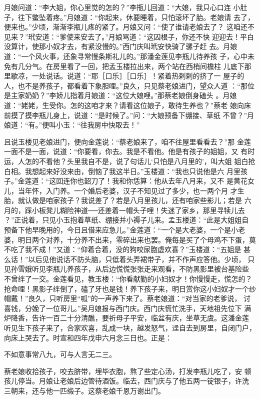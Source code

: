 月娘问道：“李大姐，你心里觉的怎的？”李瓶儿回道：“大娘，我只心口连
小肚子，往下鳖坠着疼。”月娘道：“你起来，休要睡着，只怕滚坏了胎。老娘请
去了，便来也。”少顷，渐渐李瓶儿疼的紧了。月娘又问：“使了谁请老娘去了？
这咱还不见来？”玳安道：“爹使来安去了。”月娘骂道：“这囚根子，你还不快
迎迎去！平白没算计，使那小奴才去，有紧没慢的。”西门庆叫玳安快骑了骡子赶
去。月娘道：“一个风火事，还象寻常慢条斯礼儿的。”那潘金莲见李瓶儿待养孩
子，心中未免有几分气。在房里看了一回，把孟玉楼拉出来，两个站在西梢间檐柱
儿底下那里歇凉，一处说话。说道：“耶［口乐］［口乐］！紧着热剌剌的挤了一
屋子的人，也不是养孩子，都看着下象胆哩。”良久，只见蔡老娘进门，望众人道
：“那位是主家奶奶？”李娇儿指着月娘道：“这位大娘哩。”那蔡老娘倒身磕头
。月娘道：“姥姥，生受你。怎的这咱才来？请看这位娘子，敢待生养也？”蔡老
娘向床前摸了摸李瓶儿身上，说道：“是时候了。”问：“大娘预备下绷接、草纸
不曾？”月娘道：“有。”便叫小玉：“往我房中快取去！”

且说玉楼见老娘进门，便向金莲说：“蔡老娘来了，咱不往屋里看看去？”那
金莲一面不是一面，说道：“你要看，你去。我是不看他。他是有孩子的姐姐，又
有时运，人怎的不看他？头里我自不是，说了句话儿‘只怕是八月里的’，叫大姐
姐白抢白相。我想起来好没来由，倒恼了我这半日。”玉楼道：“我也只说他是六
月里孩子。”金莲道：“这回连你也韶刀了！我和你恁算：他从去年八月来，又不
是黄花女儿，当年怀，入门养。一个婚后老婆，汉子不知见过了多少，也一两个月
才生胎，就认做是咱家孩子？我说差了？若是八月里孩儿，还有咱家些影儿；若是
六月的，踩小板凳儿糊险神道──还差着一帽头子哩！失迷了家乡，那里寻犊儿去
？”正说着，只见小玉抱着草纸、绷接并小褥子儿来。孟玉楼道：“此是大姐姐自
预备下他早晚用的，今日且借来应急儿。”金莲道：“一个是大老婆，一个是小老
婆，明日两个对养，十分养不出来，零碎出来也罢。俺每是买了个母鸡不下蛋，莫
不吃了我不成！”又道：“仰着合着，没的狗咬尿胞虚欢喜？”玉楼道：“五姐是
甚么话！”以后见他说话不防头脑，只低着头弄裙带子，并不作声应答他。少顷，
只见孙雪娥听见李瓶儿养孩子，从后边慌慌张张走来观看，不防黑影里被台基险些
不曾绊了一交。金莲看见，教玉楼：“你看献勤的小妇奴才！你慢慢走，慌怎的？
抢命哩！黑影子绊倒了，磕了牙也是钱！养下孩子来，明日赏你这小妇奴才一个纱
帽戴！”良久，只听房里“呱”的一声养下来了。蔡老娘道：“对当家的老爹说，
讨喜钱，分娩了一位哥儿。”吴月娘报与西门庆。西门庆慌忙洗手，天地祖先位下
满炉降香，告许一百二十分清醮，要祈母子平安，临盆有庆，坐草无虞。这潘金莲
听见生下孩子来了，合家欢喜，乱成一块，越发怒气，迳自去到房里，自闭门户，
向床上哭去了。时宣和四年戊申六月念三日也。正是：

不如意事常八九，可与人言无二三。

蔡老娘收拾孩子，咬去脐带，埋毕衣胞，熬了些定心汤，打发李瓶儿吃了，安
顿孩儿停当。月娘让老娘后边管待酒饭。临去，西门庆与了他五两一锭银子，许洗
三朝来，还与他一匹缎子。这蔡老娘千恩万谢出门。

